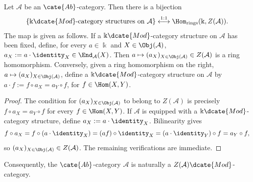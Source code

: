 \begin{proposition}\label{prop:k-linear-center}
	Let $\mathcal{A}$ be an $\cate{Ab}$-category. Then there is a bijection
	\[
		\left\{\text{$\Bbbk\dcate{Mod}$-category structures on $\mathcal{A}$}\right\}
		\stackrel{1:1}{\longleftrightarrow}
		\Hom_{\text{rings}}(\Bbbk,Z(\mathcal{A})).
	\]
	The map is given as follows. If a $\Bbbk\dcate{Mod}$-category structure on
	$\mathcal{A}$ has been fixed, define, for every $a \in \Bbbk$ and
	$X \in \Obj(\mathcal{A})$,
	$a_X := a \cdot \identity_X \in \End_{\mathcal{A}}(X)$. Then
	$a \mapsto (a_X)_{X \in \Obj(\mathcal{A})} \in Z(\mathcal{A})$ is a ring
	homomorphism. Conversely, given a ring homomorphism on the right,
	$a \mapsto (a_X)_{X \in \Obj(\mathcal{A})}$, define a
	$\Bbbk\dcate{Mod}$-category structure on $\mathcal{A}$ by
	$a \cdot f := f \circ a_X = a_Y \circ f$, for $f \in \Hom(X,Y)$.
\end{proposition}

\begin{proof}
	The condition for $(a_X)_{X \in \Obj(\mathcal{A})}$ to belong to
	$Z(\mathcal{A})$ is precisely
	$f \circ a_X = a_Y \circ f$ for every $f \in \Hom(X,Y)$. If
	$\mathcal{A}$ is equipped with a $\Bbbk\dcate{Mod}$-category structure,
	define $a_X := a \cdot \identity_X$. Bilinearity gives
	\[
		f \circ a_X = f \circ (a \cdot \identity_X)
		= (a f) \circ \identity_X
		= (a \cdot \identity_Y) \circ f
		= a_Y \circ f,
	\]
	so $(a_X)_{X \in \Obj(\mathcal{A})} \in Z(\mathcal{A})$.
	The remaining verifications are immediate.
\end{proof}

Consequently, the $\cate{Ab}$-category $\mathcal{A}$ is naturally a
$Z(\mathcal{A})\dcate{Mod}$-category.
